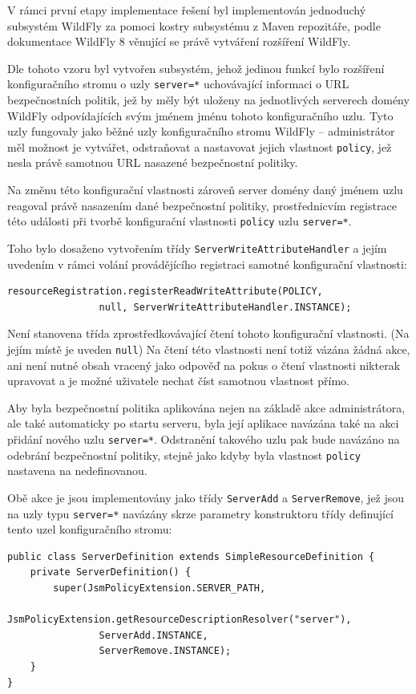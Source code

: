 V rámci první etapy implementace řešení byl implementován jednoduchý subsystém WildFly za pomoci kostry subsystému z Maven repozitáře, podle dokumentace WildFly 8 věnující se právě vytváření rozšíření WildFly. \cite{WildFlyExtending}

Dle tohoto vzoru byl vytvořen subsystém, jehož jedinou funkcí bylo rozšíření konfiguračního stromu o uzly {\tt server=*} uchovávající informaci o URL bezpečnostních politik, jež by měly být uloženy na jednotlivých serverech domény WildFly odpovídajících svým jménem jménu tohoto konfiguračního uzlu. Tyto uzly fungovaly jako běžné uzly konfiguračního stromu WildFly -- administrátor měl možnost je vytvářet, odstraňovat a nastavovat jejich vlastnost {\tt policy}, jež nesla právě samotnou URL nasazené bezpečnostní politiky.

Na změnu této konfigurační vlastnosti zároveň server domény daný jménem uzlu reagoval právě nasazením dané bezpečnostní politiky, prostřednicvím registrace této události při tvorbě konfigurační vlastnosti {\tt policy} uzlu {\tt server=*}.

Toho bylo dosaženo vytvořením třídy {\tt ServerWriteAttributeHandler} a jejím uvedením v rámci volání provádějícího registraci samotné konfigurační vlastnosti:

\begin{verbatim}
resourceRegistration.registerReadWriteAttribute(POLICY,
                null, ServerWriteAttributeHandler.INSTANCE);
\end{verbatim}

Není stanovena třída zprostředkovávající čtení tohoto konfigurační vlastnosti. (Na jejím místě je uveden {\tt null}) Na čtení této vlastnosti není totiž vázána žádná akce, ani není nutné obsah vracený jako odpověď na pokus o čtení vlastnosti nikterak upravovat a je možné uživatele nechat číst samotnou vlastnost přímo.

Aby byla bezpečnostní politika aplikována nejen na základě akce administrátora, ale také automaticky po startu serveru, byla její aplikace navázána také na akci přidání nového uzlu {\tt server=*}. Odstranění takového uzlu pak bude navázáno na odebrání bezpečnostní politiky, stejně jako kdyby byla vlastnost {\tt policy} nastavena na nedefinovanou.

Obě akce je jsou implementovány jako třídy {\tt ServerAdd} a {\tt ServerRemove}, jež jsou na uzly typu {\tt server=*} navázány skrze parametry konstruktoru třídy definující tento uzel konfiguračního stromu:

\begin{verbatim}
public class ServerDefinition extends SimpleResourceDefinition {
    private ServerDefinition() {
        super(JsmPolicyExtension.SERVER_PATH,
                JsmPolicyExtension.getResourceDescriptionResolver("server"),
                ServerAdd.INSTANCE,
                ServerRemove.INSTANCE);
    }
}
\end{verbatim}

